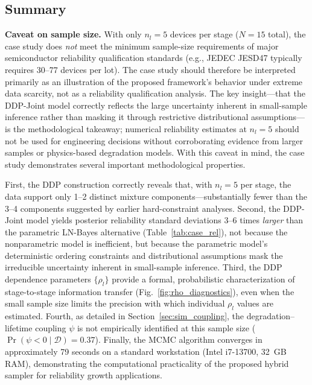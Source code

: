 \documentclass[a4paper,fleqn,longmktitle]{cas-sc}
\begin{document}
\subsection{Summary}

\textbf{Caveat on sample size.} With only $n_l=5$ devices per stage ($N=15$ total), the case study does \emph{not} meet the minimum sample-size requirements of major semiconductor reliability qualification standards (e.g., JEDEC JESD47 typically requires 30--77 devices per lot). The case study should therefore be interpreted primarily as an illustration of the proposed framework's behavior under extreme data scarcity, not as a reliability qualification analysis. The key insight---that the DDP-Joint model correctly reflects the large uncertainty inherent in small-sample inference rather than masking it through restrictive distributional assumptions---is the methodological takeaway; numerical reliability estimates at $n_l=5$ should not be used for engineering decisions without corroborating evidence from larger samples or physics-based degradation models. With this caveat in mind, the case study demonstrates several important methodological properties.

First, the DDP construction correctly reveals that, with $n_l=5$ per stage, the data support only 1--2 distinct mixture components---substantially fewer than the 3--4 components suggested by earlier hard-constraint analyses. Second, the DDP-Joint model yields posterior reliability standard deviations 3--6 times \emph{larger} than the parametric LN-Bayes alternative (Table~\ref{tab:case_rel}), not because the nonparametric model is inefficient, but because the parametric model's deterministic ordering constraints and distributional assumptions mask the irreducible uncertainty inherent in small-sample inference. Third, the DDP dependence parameters $\{\rho_l\}$ provide a formal, probabilistic characterization of stage-to-stage information transfer (Fig.~\ref{fig:rho_diagnostics}), even when the small sample size limits the precision with which individual $\rho_l$ values are estimated. Fourth, as detailed in Section~\ref{sec:sim_coupling}, the degradation--lifetime coupling $\psi$ is not empirically identified at this sample size ($\Pr(\psi < 0 \mid \mathcal{D}) = 0.37$). Finally, the MCMC algorithm converges in approximately 79 seconds on a standard workstation (Intel i7-13700, 32~GB RAM), demonstrating the computational practicality of the proposed hybrid sampler for reliability growth applications.

\end{document}
